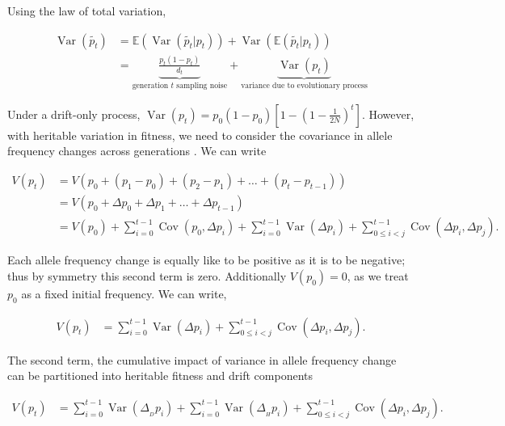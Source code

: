 \documentclass[11pt]{article}
\newcommand{\E}{\mathbb{E}}
\DeclareMathOperator{\var}{Var}
\DeclareMathOperator{\cov}{Cov}
\begin{document}
Using the law of total variation, 

\begin{align}
  \var(\widetilde{p_t}) &= \E(\var(\widetilde{p_t} | p_t)) + \var(\E(\widetilde{p_t}|p_t)) \\
                        &= \underbrace{\frac{p_t(1-p_t)}{d_t}}_\text{generation $t$ sampling noise} + \underbrace{\var(p_t)}_\text{variance due to evolutionary process}
\end{align}

Under a drift-only process, $\var(p_t) = p_0(1-p_0)\left[1- \left(1 -
\frac{1}{2N}\right)^t\right]$. However, with heritable variation in fitness, we
need to consider the covariance in allele frequency changes across generations
\parencite{Buffalo2019-io}. We can write

\begin{align}
  V(p_t) &= V\left(p_0 + (p_1 - p_0) + (p_2 - p_1) + \ldots + (p_t - p_{t-1}) \right) \\
         &= V\left(p_0 + \Delta p_0 + \Delta p_1 + \ldots + \Delta p_{t-1} \right) \\
         &= V(p_0) + \sum_{i=0}^{t-1} \cov(p_0, \Delta p_i) + \sum_{i=0}^{t-1} \var(\Delta p_i) + \sum_{0 \le i < j}^{t-1} \cov(\Delta p_i, \Delta p_j).
\end{align}
%

Each allele frequency change is equally like to be positive as it is to be
negative; thus by symmetry this second term is zero. Additionally $V(p_0) = 0$,
as we treat $p_0$ as a fixed initial frequency. We can write, 

\begin{align}
  V(p_t) &= \sum_{i=0}^{t-1} \var(\Delta p_i) + \sum_{0 \le i < j}^{t-1} \cov(\Delta p_i, \Delta p_j).
\end{align}

The second term, the cumulative impact of variance in allele frequency change
can be partitioned into heritable fitness and drift components
\parencite{Santiago1995-hx,Buffalo2019-io}

\begin{align}
  V(p_t) &= \sum_{i=0}^{t-1} \var(\Delta_{_D} p_i) + \sum_{i=0}^{t-1} \var(\Delta_{_H} p_i) + \sum_{0 \le i < j}^{t-1} \cov(\Delta p_i, \Delta p_j).
\end{align}
\end{document}
